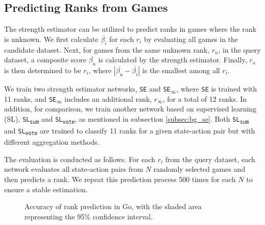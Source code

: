 \subsection{Predicting Ranks from Games}
\label{subsec:exp_acc}
The strength estimator can be utilized to predict ranks in games where the rank is unknown.
We first calculate $\overline{\beta_i}$ for each $r_i$ by evaluating all games in the candidate dataset.
Next, for games from the same unknown rank, $r_u$, in the query dataset, a composite score $\overline{\beta_u}$ is calculated by the strength estimator.
Finally, $r_u$ is then determined to be $r_i$, where $|\overline{\beta_u}-\overline{\beta_i}|$ is the smallest among all $r_i$.



We train two strength estimator networks, \texttt{SE} and \texttt{SE\textsubscript{$\infty$}}, where \texttt{SE} is trained with 11 ranks, and \texttt{SE\textsubscript{$\infty$}} includes an additional rank, $r_{\infty}$, for a total of 12 ranks.
In addition, for comparison, we train another network based on supervised learning (SL), \texttt{SL\textsubscript{sum}} and \texttt{SL\textsubscript{vote}}, as mentioned in subsection \ref{subsec:bg_se}.
Both \texttt{SL\textsubscript{sum}} and \texttt{SL\textsubscript{vote}} are trained to classify 11 ranks for a given state-action pair but with different aggregation methods.

The evaluation is conducted as follows.
For each $r_i$ from the query dataset, each network evaluates all state-action pairs from $N$ randomly selected games and then predicts a rank.
We repeat this prediction process 500 times for each $N$ to ensure a stable estimation.

\begin{figure}[ht]
    \centering
    \caption{Accuracy of rank prediction in Go, with the shaded area representing the 95\% confidence interval.}
    \label{fig:accuracy}
\end{figure}



